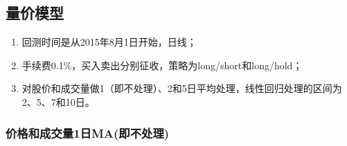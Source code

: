 \documentclass[12pt,a4paper]{article}
\begin{document}
\subsection{量价模型}

\begin{enumerate}
\item 回测时间是从2015年8月1日开始，日线；
\item 手续费0.1\%，买入卖出分别征收，策略为long/short和long/hold；
\item 对股价和成交量做1（即不处理）、2和5日平均处理，线性回归处理的区间为2、5、7和10日。
\end{enumerate}


\subsubsection{价格和成交量1日MA(即不处理)}
\end{document}
